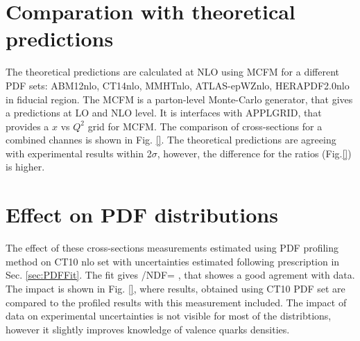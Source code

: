 \section{Comparation with theoretical predictions}\label{sec:CompCs}

The theoretical predictions are calculated at NLO using MCFM\cite{MCFM} for a different PDF sets: ABM12nlo\cite{ABM12}, CT14nlo\cite{CT14}, MMHTnlo\cite{MMHT}, ATLAS-epWZnlo, HERAPDF2.0nlo in fiducial region. The MCFM is a parton-level Monte-Carlo generator, that gives a predictions at LO and NLO level. It is interfaces with APPLGRID\cite{APPLGRID}, that provides a $x$ vs $Q^2$ grid for MCFM. The comparison of cross-sections for a combined channes is shown in Fig. \ref{}. The theoretical predictions are agreeing with experimental results within 2$\sigma$, however, the difference for the ratios (Fig.\ref{}) is higher. 



\section{Effect on PDF distributions}\label{sec:PDFCs}

The effect of these cross-sections measurements estimated using PDF profiling method on CT10 nlo set with uncertainties estimated following prescription in Sec. \ref{sec:PDFFit}. The fit gives \chiD/NDF= , that showes a good agrement with data.  The impact is shown in Fig. \ref{}, where results, obtained using CT10 PDF set are compared to the profiled results with this measurement included. The impact of data on experimental uncertainties is not visible for most of the distribtions, however it slightly improves knowledge of valence quarks densities.